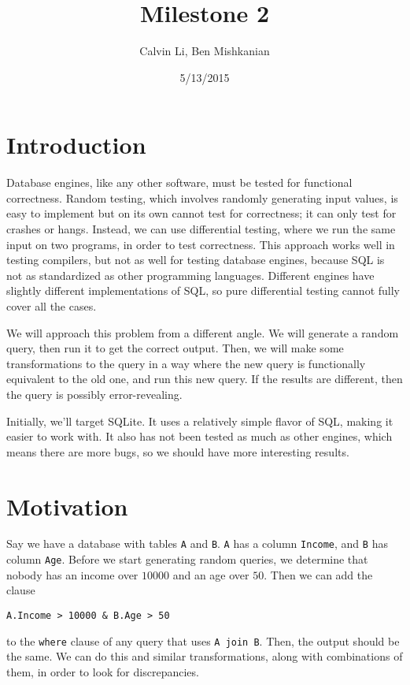 \documentclass[conference]{acmsiggraph}
\title{Milestone 2}
\author{Calvin Li, Ben Mishkanian}
\date{5/13/2015}
\newcommand{\mono}{\texttt}
\begin{document}
\maketitle


\copyrightspace

\section{Introduction}
Database engines, like any other software, must be tested for functional correctness. Random testing, which involves randomly generating input values, is easy to implement but on its own cannot test for correctness; it can only test for crashes or hangs. Instead, we can use differential testing, where we run the same input on two programs, in order to test correctness. This approach works well in testing compilers, but not as well for testing database engines, because SQL is not as standardized as other programming languages. Different engines have slightly different implementations of SQL, so pure differential testing cannot fully cover all the cases.

We will approach this problem from a different angle. We will generate a random query, then run it to get the correct output. Then, we will make some transformations to the query in a way where the new query is functionally equivalent to the old one, and run this new query. If the results are different, then the query is possibly error-revealing.

Initially, we'll target SQLite. It uses a relatively simple flavor of SQL, making it easier to work with. It also has not been tested as much as other engines, which means there are more bugs, so we should have more interesting results. 

\section{Motivation}

Say we have a database with tables \mono A and \mono B. \mono A has a column \mono{Income}, and \mono B has column \mono{Age}. Before we start generating random queries, we determine that nobody has an income over \(10000\) and an age over \(50\). Then we can add the clause 
\begin{center}
\begin{verbatim}
A.Income > 10000 & B.Age > 50
\end{verbatim}
\end{center}
to the \mono{where} clause of any query that uses \mono{A join B}. Then, the output should be the same. We can do this and similar transformations, along with combinations of them, in order to look for discrepancies. 
\end{document}
